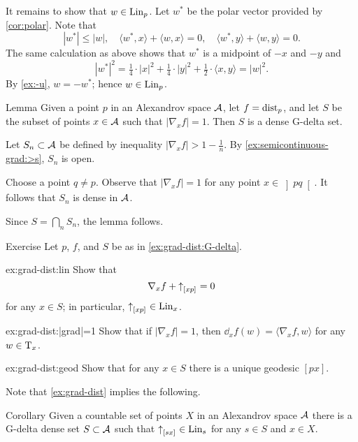 It remains to show that $w\in\mathop{\rm Lin}\nolimits_p$.
Let $w^*$ be the polar vector provided by \ref{cor:polar}.
Note that 
\[|w^*|\le |w|,
\quad
\langle w^*,x\rangle+\langle w,x\rangle=0,
\quad
\langle w^*,y\rangle+\langle w,y\rangle=0.
\]
The same calculation as above shows that $w^*$ is a midpoint of $-x$ and $-y$ and 
\[|w^*|^2= \tfrac14\cdot |x|^2+\tfrac14\cdot|y|^2+\tfrac12\cdot\langle x,y\rangle=|w|^2.\]
By \ref{ex:-u}, $w=-w^*$;
hence $w\in\mathop{\rm Lin}\nolimits_p$.
\qeds

\begin{thm}{Lemma}\label{ex:grad-dist:G-delta}
Given a point $p$ in an Alexandrov space $\mathcal{A}$,
let $f=\mathrm{dist}_p$, and let $S$ be the subset of points $x\in\mathcal{A}$ such that $|\nabla_xf|=1$.
Then $S$ is a dense G-delta set.

\end{thm}

Let $S_n\subset \mathcal{A}$ be defined by inequality $|\nabla_xf|>1-\tfrac1n$.
By \ref{ex:semicontinuous-grad:>s}, $S_n$ is open.

Choose a point $q\ne p$.
Observe that $|\nabla_xf|=1$ for any point $x\in\left]pq\right[$.
It follows that $S_n$ is dense in $\mathcal{A}$.

Since $S=\bigcap_nS_n$, the lemma follows.
\qeds


\begin{thm}{Exercise}\label{ex:grad-dist}
Let $p$, $f$, and $S$ be as in \ref{ex:grad-dist:G-delta}.

\begin{subthm}{ex:grad-dist:lin}
Show that 
\[\nabla_xf+{\uparrow}_{[{x}{p}]_{{}}}=0\]
for any 
$x\in S$;
in particular, ${\uparrow}_{[{x}{p}]_{{}}}\in \mathop{\rm Lin}\nolimits_x$.
\end{subthm}

\begin{subthm}{ex:grad-dist:|grad|=1}
Show that if $|\nabla_xf|=1$, then $\dd_xf(w)= \langle\nabla_xf,w\rangle$ for any $w\in \mathrm{T}_x$.
\end{subthm}

\begin{subthm}{ex:grad-dist:geod}
Show that for any $x\in S$ there is a unique geodesic $[px]$.
\end{subthm}

\end{thm}

Note that \ref{ex:grad-dist} implies the following.

\begin{thm}{Corollary}\label{cor:euclid-subcone}
Given a countable set of points $X$ in an Alexandrov space $\mathcal{A}$
there is a G-delta dense set $S\subset\mathcal{A}$
such that 
${\uparrow}_{[{s}{x}]_{{}}}\in \mathop{\rm Lin}\nolimits_s$
for any $s\in S$ and $x\in X$.
\end{thm}

